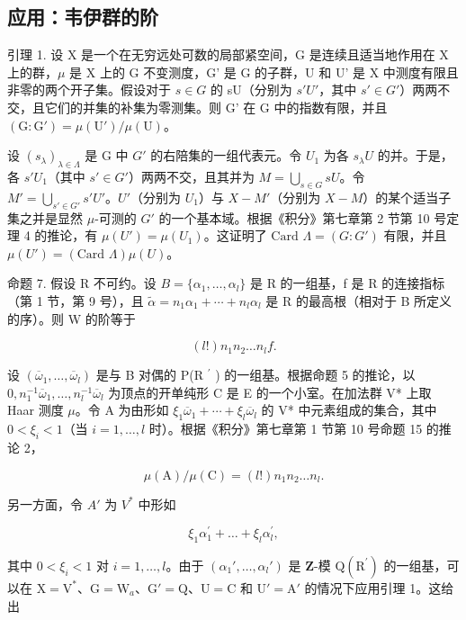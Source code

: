 \subsection{应用：韦伊群的阶}

引理 1. 设 X 是一个在无穷远处可数的局部紧空间，G 是连续且适当地作用在 X 上的群，\(\mu\) 是 X 上的 G 不变测度，G' 是 G 的子群，U 和 U' 是 X 中测度有限且非零的两个开子集。假设对于 \(s \in G\) 的 sU（分别为 \(s'U'\)，其中 \(s' \in G'\)）两两不交，且它们的并集的补集为零测集。则 G' 在 G 中的指数有限，并且 \((\mathrm{G} : \mathrm{G}') = \mu(\mathrm{U}') / \mu(\mathrm{U})\)。

设 \((s_{\lambda})_{\lambda \in \Lambda}\) 是 G 中 \(G'\) 的右陪集的一组代表元。令 \(U_1\) 为各 \(s_{\lambda}U\) 的并。于是，各 \(s'U_1\)（其中 \(s' \in G'\)）两两不交，且其并为 \(M = \bigcup_{s \in G} sU\)。令 \(M' = \bigcup_{s' \in G'} s'U'\)。\(U'\)（分别为 \(U_1\)）与 \(X - M'\)（分别为 \(X - M\)）的某个适当子集之并是显然 \(\mu\)-可测的 \(G'\) 的一个基本域。根据《积分》第七章第 2 节第 10 号定理 4 的推论，有 \(\mu(U') = \mu(U_1)\)。这证明了 \(\text{Card } \Lambda = (G : G')\) 有限，并且 \(\mu(U') = (\text{Card } \Lambda)\mu(U)\)。

命题 7. 假设 R 不可约。设 \(B = \{\alpha_{1}, \ldots, \alpha_{l}\}\) 是 R 的一组基，f 是 R 的连接指标（第 1 节，第 9 号），且 \(\tilde{\alpha} = n_{1}\alpha_{1} + \cdots + n_{l}\alpha_{l}\) 是 R 的最高根（相对于 B 所定义的序）。则 W 的阶等于

\[
(l!) n _ {1} n _ {2} \dots n _ {l} f.
\]

设 \((\overline{\omega}_{1},\ldots,\overline{\omega}_{l})\) 是与 B 对偶的 P(R \(^{\prime}\) ) 的一组基。根据命题 5 的推论，以 \(0,n_{1}^{-1}\overline{\omega}_{1},\ldots,n_{l}^{-1}\overline{\omega}_{l}\) 为顶点的开单纯形 C 是 E 的一个小室。在加法群 V* 上取 Haar 测度 \(\mu\)。令 A 为由形如 \(\xi_{1}\overline{\omega}_{1}+\cdots+\xi_{l}\overline{\omega}_{l}\) 的 V* 中元素组成的集合，其中 \(0<\xi_{i}<1\)（当 \(i=1,\ldots,l\) 时）。根据《积分》第七章第 1 节第 10 号命题 15 的推论 2，

\[
\mu (\mathrm{A}) / \mu (\mathrm{C}) = (l!) n _ {1} n _ {2} \dots n _ {l}.\tag{5}
\]

另一方面，令 \(A'\) 为 \(V^{*}\) 中形如

\[
\xi_ {1} \alpha_ {1} ^ {\prime} + \dots + \xi_ {l} \alpha_ {l} ^ {\prime},
\]

其中 \(0 < \xi_i < 1\) 对 \(i = 1, \ldots, l\)。由于 \((\alpha_1', \ldots, \alpha_l')\) 是 \(\mathbf{Z}\)-模 \(\mathrm{Q}(\mathrm{R}^{\prime})\) 的一组基，可以在 \(\mathrm{X} = \mathrm{V}^*\)、\(\mathrm{G} = \mathrm{W}_a\)、\(\mathrm{G}' = \mathrm{Q}\)、\(\mathrm{U} = \mathrm{C}\) 和 \(\mathrm{U}' = \mathrm{A}'\) 的情况下应用引理 1。这给出

